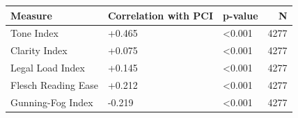 \begin{tabular}{lllr}
\toprule
Measure & Correlation with PCI & p-value & N \\
\midrule
Tone Index & +0.465 & <0.001 & 4277 \\
Clarity Index & +0.075 & <0.001 & 4277 \\
Legal Load Index & +0.145 & <0.001 & 4277 \\
Flesch Reading Ease & +0.212 & <0.001 & 4277 \\
Gunning-Fog Index & -0.219 & <0.001 & 4277 \\
\bottomrule
\end{tabular}
